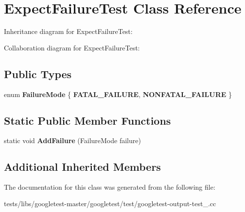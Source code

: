 \hypertarget{classExpectFailureTest}{}\section{Expect\+Failure\+Test Class Reference}
\label{classExpectFailureTest}


Inheritance diagram for Expect\+Failure\+Test\+:


Collaboration diagram for Expect\+Failure\+Test\+:
\subsection*{Public Types}
\begin{DoxyCompactItemize}
\item 
\mbox{\label{classExpectFailureTest_aad05da10bb15d21a434eba3b37011406}} 
enum {\bfseries Failure\+Mode} \{ {\bfseries F\+A\+T\+A\+L\+\_\+\+F\+A\+I\+L\+U\+RE}, 
{\bfseries N\+O\+N\+F\+A\+T\+A\+L\+\_\+\+F\+A\+I\+L\+U\+RE}
 \}
\end{DoxyCompactItemize}
\subsection*{Static Public Member Functions}
\begin{DoxyCompactItemize}
\item 
\mbox{\label{classExpectFailureTest_ab9aeb7820ff7953fc2975ecc5abd046b}} 
static void {\bfseries Add\+Failure} (Failure\+Mode failure)
\end{DoxyCompactItemize}
\subsection*{Additional Inherited Members}


The documentation for this class was generated from the following file\+:\begin{DoxyCompactItemize}
\item 
tests/libs/googletest-\/master/googletest/test/googletest-\/output-\/test\+\_\+.\+cc\end{DoxyCompactItemize}
